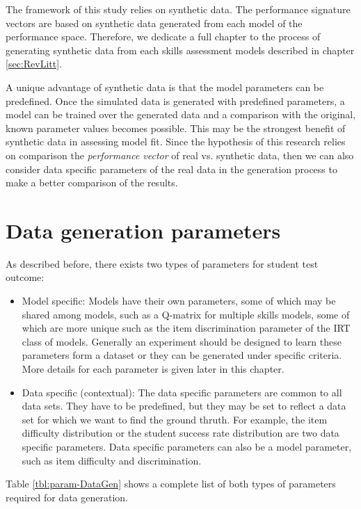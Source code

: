 \label{sec:Syn}

The framework of this study relies on synthetic data. The performance signature vectors are based on synthetic data generated from each model of the performance space.  Therefore, we dedicate a full chapter to the process of generating synthetic data from each skills assessment models described in chapter \ref{sec:RevLitt}.

A unique advantage of synthetic data is that the model parameters can be predefined. Once the simulated data is generated with predefined parameters, a model can be trained over the generated data and a comparison with the original, known parameter values becomes possible. This may be the strongest benefit of synthetic data in assessing model fit. Since the hypothesis of this research relies on comparison the \textit{performance vector} of real vs. synthetic data, then we can also consider data specific parameters of the real data in the generation process to make a better comparison of the results.

\section{Data generation parameters}

As described before, there exists two types of parameters for student test outcome:
\begin{itemize}
\item Model specific: Models have their own parameters, some of which may be shared among models, such as a Q-matrix for multiple skills models, some of which are more unique such as the item discrimination parameter of the IRT class of models. Generally an experiment should be designed to learn these parameters form a dataset or they can be generated under specific criteria. More details for each parameter is given later in this chapter.
\item Data specific (contextual): The data specific parameters are common to all data sets.  They have to be predefined, but they may be set to reflect a data set for which we want to find the ground thruth.  For example, the item difficulty distribution or the student success rate distribution are two data specific parameters.  Data specific parameters can also be a model parameter, such as item difficulty and discrimination.
\end{itemize}

Table \ref{tbl:param-DataGen} shows a complete list of both types of parameters required for data generation.

